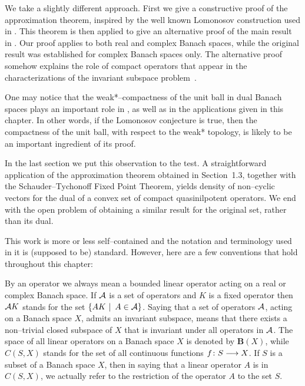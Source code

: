 We take a slightly different approach. First we give a
constructive proof of the approximation theorem, inspired by
the well known Lomonosov construction used in
\cite{Lom73,RR73}. This theorem is then applied to give an
alternative proof of the main result in \cite{AAB95}. Our proof
applies to both real and complex Banach spaces, while the
original result was established for complex Banach spaces only.
The alternative proof somehow explains the role of compact
operators that appear in the characterizations of the invariant
subspace problem~\cite{AAB95}.

\medskip

One may notice that the weak*--compactness of the unit ball in
dual Banach spaces plays an important role in
\cite{AAB95,dB59,dB93,Lom91}, as well as in the applications
given in this chapter. In other words, if the Lomonosov
conjecture is true, then the compactness of the unit ball, with
respect to the weak* topology, is likely to be an important
ingredient of its proof.

\smallskip

In the last section we put this observation to the test. A
straightforward application of the approximation theorem
obtained in Section~1.3, together with the Schauder--Tychonoff
Fixed Point Theorem, yields density of non--cyclic vectors for
the dual of a convex set of compact quasinilpotent operators.
We end with the open problem of obtaining a similar result for
the original set, rather than its dual.

\bigskip

This work is more or less self--contained and the notation and
terminology used in it is (supposed to be) standard. However,
here are a few conventions that hold throughout this chapter:

\bigskip

By an operator we always mean a bounded linear operator acting
on a real or complex Banach space. If ${\cal A}$ is a set of
operators and $K$ is a fixed operator then ${\cal A}{}K$ stands for
the set $\left\{A{}K\,\,|\,\,\,A\in{\cal A}\right\}$. Saying that a set of
operators ${\cal A}$, acting on a Banach space $X$, admits an
invariant subspace, means that there exists a non--trivial
closed subspace of $X$ that is invariant under all operators in
${\cal A}$. The space of all linear operators on a Banach space $X$
is denoted by $\mathbf{B}(X)$, while $C(S,X)$ stands for the
set of all continuous functions $f\colon{}S\longrightarrow{}X$. If $S$ is a
subset of a Banach space $X$, then in saying that a linear
operator $A$ is in $C(S,X)$, we actually refer to the
restriction of the operator $A$ to the set $S$.

